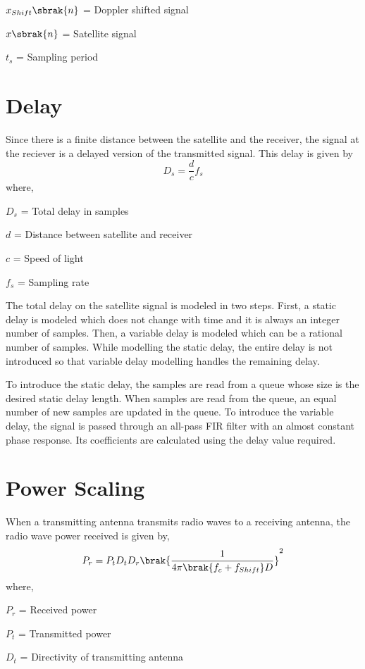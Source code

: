 \documentclass[11pt]{book}
\begin{document}
$x_{Shift}\sbrak{n}$ = Doppler shifted signal

$x\sbrak{n}$ = Satellite signal

$t_{s}$ = Sampling period

\section{Delay}
Since there is a finite distance between the satellite and the receiver, the signal at the reciever is a delayed version of the transmitted signal. This delay is given by
\begin{equation}
    D_{s} = \frac{d}{c}f_{s} 
\end{equation}
where,

$D_{s}$ = Total delay in samples

$d$ = Distance between satellite and receiver

$c$ = Speed of light

$f_{s}$ = Sampling rate

The total delay on the satellite signal is modeled in two steps. First, a static delay is modeled which does not change with time and it is always an integer number of samples. Then, %
a variable delay is modeled which can be a rational number of samples. While modelling the static delay, the entire delay is not introduced so that variable delay modelling handles the remaining %
delay.

To introduce the static delay, the samples are read from a queue whose size is the desired static delay length. When samples are read from the queue, an equal number of new samples are %
updated in the queue. To introduce the variable delay, the signal is passed through an all-pass FIR filter with an almost constant phase response. Its coefficients are calculated %
using the delay value required.

\section{Power Scaling}
When a transmitting antenna transmits radio waves to a receiving antenna, the radio wave power received is given by,
\begin{equation}
    P_r = P_t D_t D_r \brak{\frac{1}{4 \pi \brak{f_c + f_{Shift}} D}}^2
\end{equation}
where,

$P_r$ = Received power

$P_t$ = Transmitted power

$D_t$ = Directivity of transmitting antenna 
\end{document}
